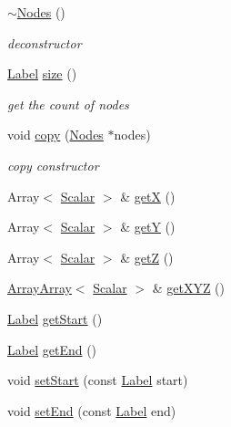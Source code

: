 \begin{DoxyCompactItemize}
\item 
\hyperlink{classHSF_1_1Nodes_aad6cecbfe88532697dedfca221638d89}{$\sim$Nodes} ()
\begin{DoxyCompactList}\small\item\em deconstructor \item\end{DoxyCompactList}\item 
\hyperlink{namespaceHSF_ae65d72be782e989396ebe5ec6ae4c2b6}{Label} \hyperlink{classHSF_1_1Nodes_a8e3420be01fedbc5682e037631c28465}{size} ()
\begin{DoxyCompactList}\small\item\em get the count of nodes \item\end{DoxyCompactList}\item 
void \hyperlink{classHSF_1_1Nodes_a77f909942d5128a6cf8bb7fe6348a26d}{copy} (\hyperlink{classHSF_1_1Nodes}{Nodes} $\ast$nodes)
\begin{DoxyCompactList}\small\item\em copy constructor \item\end{DoxyCompactList}\item 
Array$<$ \hyperlink{namespaceHSF_a7419497552ed1c5631a818b75eed1aec}{Scalar} $>$ \& \hyperlink{classHSF_1_1Nodes_a7bd1a1a78aab473faef1ebacacf9f731}{getX} ()
\item 
Array$<$ \hyperlink{namespaceHSF_a7419497552ed1c5631a818b75eed1aec}{Scalar} $>$ \& \hyperlink{classHSF_1_1Nodes_a4812ccaf862af8b114903ca9adf68ded}{getY} ()
\item 
Array$<$ \hyperlink{namespaceHSF_a7419497552ed1c5631a818b75eed1aec}{Scalar} $>$ \& \hyperlink{classHSF_1_1Nodes_a2de318fe71131d231c84a79bc228f35b}{getZ} ()
\item 
\hyperlink{classHSF_1_1ArrayArray}{ArrayArray}$<$ \hyperlink{namespaceHSF_a7419497552ed1c5631a818b75eed1aec}{Scalar} $>$ \& \hyperlink{classHSF_1_1Nodes_a11ee5739c1d94dd00efb39f461a257ff}{getXYZ} ()
\item 
\hyperlink{namespaceHSF_ae65d72be782e989396ebe5ec6ae4c2b6}{Label} \hyperlink{classHSF_1_1Nodes_ac040e3ba37f121943eb2d90c785addce}{getStart} ()
\item 
\hyperlink{namespaceHSF_ae65d72be782e989396ebe5ec6ae4c2b6}{Label} \hyperlink{classHSF_1_1Nodes_aa61b5c705ee968a95ba9036e55574ca1}{getEnd} ()
\item 
void \hyperlink{classHSF_1_1Nodes_ab8ee8ad861d256901605c11552e003d4}{setStart} (const \hyperlink{namespaceHSF_ae65d72be782e989396ebe5ec6ae4c2b6}{Label} start)
\item 
void \hyperlink{classHSF_1_1Nodes_a7dd80e94f1eae9c903ad4b2797dc0375}{setEnd} (const \hyperlink{namespaceHSF_ae65d72be782e989396ebe5ec6ae4c2b6}{Label} end)
\end{DoxyCompactItemize}


